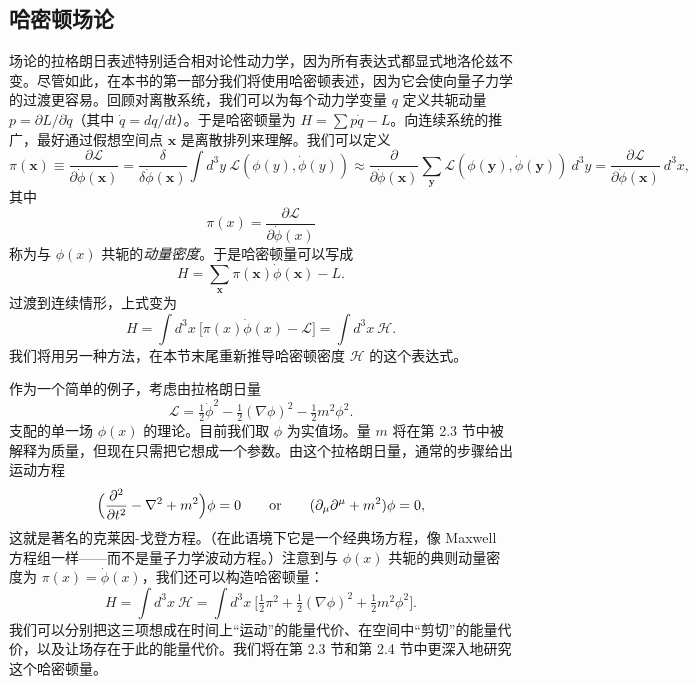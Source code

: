 \subsection*{哈密顿场论}

场论的拉格朗日表述特别适合相对论性动力学，因为所有表达式都显式地洛伦兹不变。尽管如此，在本书的第一部分我们将使用哈密顿表述，因为它会使向量子力学的过渡更容易。回顾对离散系统，我们可以为每个动力学变量 $q$ 定义共轭动量 $p = \partial L/\partial\dot{q}$（其中 $\dot{q} = dq/dt$）。于是哈密顿量为 $H = \sum p\dot{q} - L$。向连续系统的推广，最好通过假想空间点 $\mathbf{x}$ 是离散排列来理解。我们可以定义
\begin{equation}
  \pi(\mathbf{x}) \equiv \frac{\partial\mathcal{L}}
    {\partial\dot{\phi}(\mathbf{x})}
  = \frac{\delta}{\delta\dot{\phi}(\mathbf{x})}
    \int d^3y\ \mathcal{L}(\phi(y), \dot{\phi}(y))
  \approx \frac{\partial}{\partial\dot{\phi}(\mathbf{x})}
    \sum_{\mathbf{y}} \mathcal{L}(\phi(\mathbf{y}), \dot{\phi}(\mathbf{y}))
    \ d^3y = \frac{\partial\mathcal{L}}{\partial\dot{\phi}(\mathbf{x})}\ d^3x,
  \label{eq:2.4}
\end{equation}
其中
\begin{equation}
  \pi(x) = \frac{\partial\mathcal{L}}{\partial\dot{\phi}(x)}
\end{equation}
称为与 $\phi(x)$ 共轭的\emph{动量密度}。于是哈密顿量可以写成
\begin{equation}
  H = \sum_{\mathbf{x}} \pi(\mathbf{x})\dot{\phi}(\mathbf{x}) - L .
\end{equation}
过渡到连续情形，上式变为
\begin{equation}
  H = \int d^3x\ \bigl[ \pi(x)\dot{\phi}(x) - \mathcal{L} \bigr]
    = \int d^3x\ \mathcal{H} .
  \label{eq:2.5}
\end{equation}
我们将用另一种方法，在本节末尾重新推导哈密顿密度 $\mathcal{H}$ 的这个表达式。

作为一个简单的例子，考虑由拉格朗日量
\begin{equation}
  \mathcal{L} = \tfrac{1}{2}\dot{\phi}^2 - \tfrac{1}{2}(\nabla\phi)^2
    - \tfrac{1}{2}m^2\phi^2 .
  \label{eq:2.6}
\end{equation}
支配的单一场 $\phi(x)$ 的理论。目前我们取 $\phi$ 为实值场。量 $m$ 将在第 2.3 节中被解释为质量，但现在只需把它想成一个参数。由这个拉格朗日量，通常的步骤给出运动方程
\begin{equation}
  \Bigl( \frac{\partial^2}{\partial t^2} - \nabla^2 + m^2 \Bigr)\phi = 0
  \qquad\text{or}\qquad (\partial_\mu\partial^\mu + m^2)\phi = 0,
  \label{eq:2.7}
\end{equation}
这就是著名的克莱因-戈登方程。（在此语境下它是一个经典场方程，像 Maxwell 方程组一样——而不是量子力学波动方程。）注意到与 $\phi(x)$ 共轭的典则动量密度为 $\pi(x) = \dot{\phi}(x)$，我们还可以构造哈密顿量：
\begin{equation}
  H = \int d^3x\ \mathcal{H}
    = \int d^3x\ \bigl[ \tfrac{1}{2}\pi^2 + \tfrac{1}{2}(\nabla\phi)^2
      + \tfrac{1}{2}m^2\phi^2 \bigr].
  \label{eq:2.8}
\end{equation}
我们可以分别把这三项想成在时间上``运动''的能量代价、在空间中``剪切''的能量代价，以及让场存在于此的能量代价。我们将在第 2.3 节和第 2.4 节中更深入地研究这个哈密顿量。

